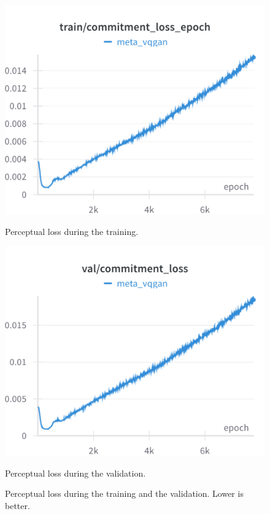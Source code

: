 \begin{figure}[H]
\includegraphics[width=\linewidth]{detailed_engineering/Meta VQGAN/charts/Section-2-Panel-11-4ox8mpc2c.png}
\caption{Perceptual loss during the training.}
\endminipage\hfill
{}
\includegraphics[width=\linewidth]{detailed_engineering/Meta VQGAN/charts/Section-4-Panel-2-2k8ixubhi.png}
\caption{Perceptual loss during the validation.}
\endminipage
\caption{Perceptual loss during the training and the validation. Lower is better.}
\end{figure}

